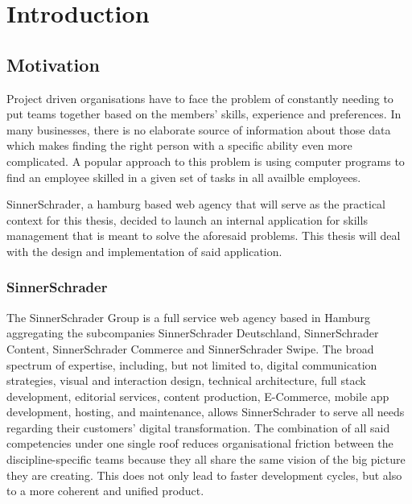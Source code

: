 \chapter{Introduction}

\section{Motivation}
Project driven organisations have to face the problem of constantly needing to put teams together based on the members’ skills, experience and preferences.
In many businesses, there is no elaborate source of information about those data which makes finding the right person with a specific ability even more complicated. A popular approach to this problem is using computer programs to find an employee skilled in a given set of tasks in all availble employees.

SinnerSchrader, a hamburg based web agency that will serve as the practical context for this thesis, decided to launch an internal application for skills management that is meant to solve the aforesaid problems. This thesis will deal with the design and implementation of said application.



\subsection{SinnerSchrader}

The SinnerSchrader Group is a full service web agency based in Hamburg aggregating the subcompanies SinnerSchrader Deutschland, SinnerSchrader Content, SinnerSchrader Commerce and SinnerSchrader Swipe. The broad spectrum of expertise, including, but not limited to, digital communication strategies, visual and interaction design,  technical architecture, full stack development, editorial services, content production, E-Commerce, mobile app development, hosting, and maintenance, allows SinnerSchrader to serve all needs regarding their customers' digital transformation. The combination of all said competencies under one single roof reduces organisational friction between the discipline-specific teams because they all share the same vision of the big picture they are creating. This does not only lead to faster development cycles, but also to a more coherent and unified product.

